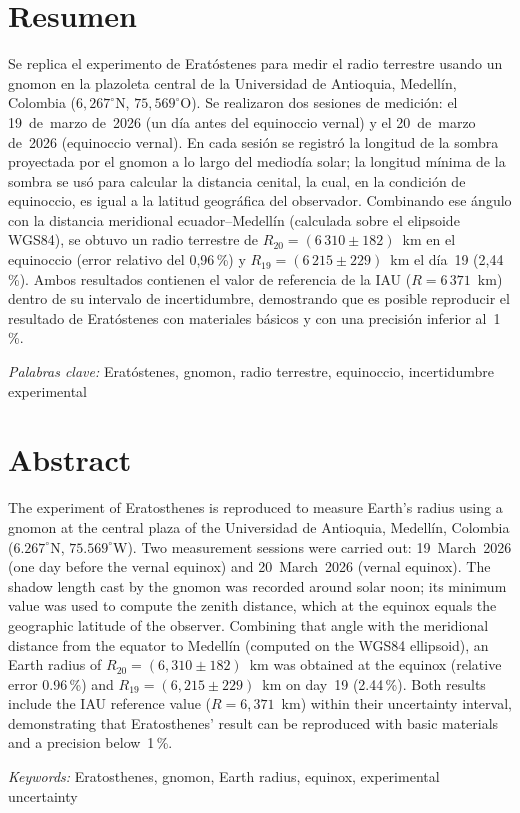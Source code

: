 \markright{\mititulo \hspace{5cm} \thepage}
\pagestyle{fancy}

\section*{Resumen}

\noindent Se replica el experimento de Eratóstenes para medir el radio terrestre
usando un gnomon en la plazoleta central de la Universidad de Antioquia,
Medellín, Colombia ($6{,}267^\circ$N, $75{,}569^\circ$O).
Se realizaron dos sesiones de medición: el 19~de~marzo de~2026 (un día
antes del equinoccio vernal) y el 20~de~marzo de~2026 (equinoccio vernal).
En cada sesión se registró la longitud de la sombra proyectada por el
gnomon a lo largo del mediodía solar; la longitud mínima de la sombra
se usó para calcular la distancia cenital, la cual, en la condición de
equinoccio, es igual a la latitud geográfica del observador.
Combinando ese ángulo con la distancia meridional ecuador--Medellín
(calculada sobre el elipsoide WGS84), se obtuvo un radio terrestre de
$R_{20} = (6\,310 \pm 182)$~km en el equinoccio (error relativo del
0{,}96\,\%) y $R_{19} = (6\,215 \pm 229)$~km el día~19 (2{,}44\,\%).
Ambos resultados contienen el valor de referencia de la IAU
($R = 6\,371$~km) dentro de su intervalo de incertidumbre,
demostrando que es posible reproducir el resultado de Eratóstenes
con materiales básicos y con una precisión inferior al~1\,\%.

\vspace{1cm}\textit{Palabras clave:} Eratóstenes, gnomon, radio terrestre, equinoccio, incertidumbre experimental

\newpage

\section*{Abstract}

\noindent The experiment of Eratosthenes is reproduced to measure Earth's radius
using a gnomon at the central plaza of the Universidad de Antioquia,
Medellín, Colombia ($6.267^\circ$N, $75.569^\circ$W).
Two measurement sessions were carried out: 19~March~2026 (one day before
the vernal equinox) and 20~March~2026 (vernal equinox).
The shadow length cast by the gnomon was recorded around solar noon;
its minimum value was used to compute the zenith distance, which at the
equinox equals the geographic latitude of the observer.
Combining that angle with the meridional distance from the equator to
Medellín (computed on the WGS84 ellipsoid), an Earth radius of
$R_{20} = (6{,}310 \pm 182)$~km was obtained at the equinox
(relative error 0.96\,\%) and $R_{19} = (6{,}215 \pm 229)$~km on
day~19 (2.44\,\%). Both results include the IAU reference value
($R = 6{,}371$~km) within their uncertainty interval, demonstrating
that Eratosthenes' result can be reproduced with basic materials
and a precision below~1\,\%.

\vspace{1cm}\textit{Keywords:} Eratosthenes, gnomon, Earth radius, equinox, experimental uncertainty

\newpage
